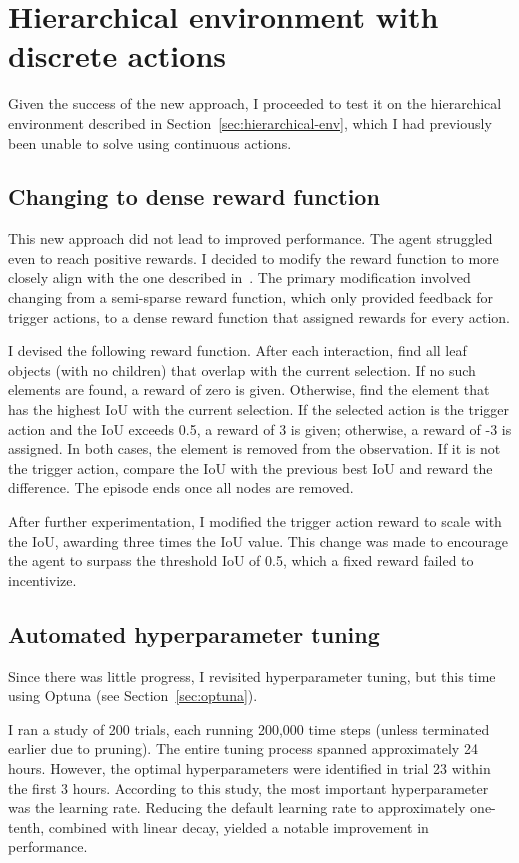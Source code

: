 \documentclass[
  digital,     %
  oneside,     %
  nosansbold,  %
  nocolorbold, %
  lof,         %
  lot,         %
]{fithesis4}
\begin{document}
\section{Hierarchical environment with discrete actions}

Given the success of the new approach, I proceeded to test it on the hierarchical environment described in Section~\ref{sec:hierarchical-env}, which I had previously been unable to solve using continuous actions.

\subsection{Changing to dense reward function}

This new approach did not lead to improved performance. The agent struggled even to reach positive rewards. I decided to modify the reward function to more closely align with the one described in~\cite{iterative_od_with_rl}. The primary modification involved changing from a semi-sparse reward function, which only provided feedback for trigger actions, to a dense reward function that assigned rewards for every action.

I devised the following reward function. After each interaction, find all leaf objects (with no children) that overlap with the current selection. If no such elements are found, a reward of zero is given. Otherwise, find the element that has the highest IoU with the current selection. If the selected action is the trigger action and the IoU exceeds 0.5, a reward of 3 is given; otherwise, a reward of -3 is assigned. In both cases, the element is removed from the observation. If it is not the trigger action, compare the IoU with the previous best IoU and reward the difference. The episode ends once all nodes are removed.

After further experimentation, I modified the trigger action reward to scale with the IoU, awarding three times the IoU value. This change was made to encourage the agent to surpass the threshold IoU of 0.5, which a fixed reward failed to incentivize.

\subsection{Automated hyperparameter tuning}

Since there was little progress, I revisited hyperparameter tuning, but this time using Optuna (see Section~\ref{sec:optuna}).

I ran a study of 200 trials, each running 200,000 time steps (unless terminated earlier due to pruning). The entire tuning process spanned approximately 24 hours. However, the optimal hyperparameters were identified in trial 23 within the first 3 hours. According to this study, the most important hyperparameter was the learning rate. Reducing the default learning rate to approximately one-tenth, combined with linear decay, yielded a notable improvement in performance.
\end{document}

